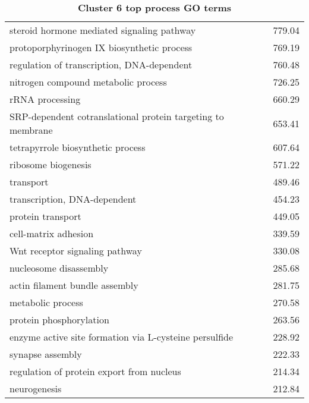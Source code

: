\begin{table}[h]
\begin{center}
\begin{tabular}{p{}r}
steroid hormone mediated signaling pathway                              & 779.04                      \\
protoporphyrinogen IX biosynthetic process                              & 769.19                      \\
regulation of transcription, DNA-dependent                              & 760.48                      \\
nitrogen compound metabolic process                                     & 726.25                      \\
rRNA processing                                                         & 660.29                      \\
SRP-dependent cotranslational protein targeting to membrane             & 653.41                      \\
tetrapyrrole biosynthetic process                                       & 607.64                      \\
ribosome biogenesis                                                     & 571.22                      \\
transport                                                               & 489.46                      \\
transcription, DNA-dependent                                            & 454.23                      \\
protein transport                                                       & 449.05                      \\
cell-matrix adhesion                                                    & 339.59                      \\
Wnt receptor signaling pathway                                          & 330.08                      \\
nucleosome disassembly                                                  & 285.68                      \\
actin filament bundle assembly                                          & 281.75                      \\
metabolic process                                                       & 270.58                      \\
protein phosphorylation                                                 & 263.56                      \\
enzyme active site formation via L-cysteine persulfide                  & 228.92                      \\
synapse assembly                                                        & 222.33                      \\
regulation of protein export from nucleus                               & 214.34                      \\
neurogenesis                                                            & 212.84                      \\ \bottomrule
\end{tabular}
\end{center}

\caption[Cluster 6 top process GO terms]{\sf \textbf{Cluster 6 top process GO terms}}
\label{tab:cls6-process}
\end{table}